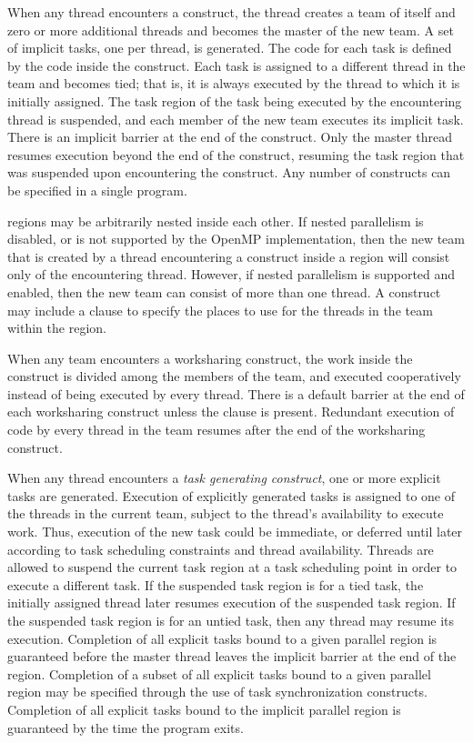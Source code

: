 When any thread encounters a  construct, the thread creates a team of itself
and zero or more additional threads and becomes the master of the new team. A set of 
implicit tasks, one per thread, is generated. The code for each task is defined by the code 
inside the  construct. Each task is assigned to a different thread in the team
and becomes tied; that is, it is always executed by the thread to which it is initially 
assigned. The task region of the task being executed by the encountering thread is 
suspended, and each member of the new team executes its implicit task. There is an 
implicit barrier at the end of the  construct. Only the master thread resumes
execution beyond the end of the  construct, resuming the task region that
was suspended upon encountering the  construct. Any number of
 constructs can be specified in a single program.

 regions may be arbitrarily nested inside each other. If nested parallelism is
disabled, or is not supported by the OpenMP implementation, then the new team that is 
created by a thread encountering a  construct inside a  region
will consist only of the encountering thread. However, if nested parallelism is supported 
and enabled, then the new team can consist of more than one thread. A 
construct may include a  clause to specify the places to use for the threads
in the team within the  region.

When any team encounters a worksharing construct, the work inside the construct is 
divided among the members of the team, and executed cooperatively instead of being 
executed by every thread. There is a default barrier at the end of each worksharing 
construct unless the  clause is present. Redundant execution of code by every
thread in the team resumes after the end of the worksharing construct.

When any thread encounters a \emph{task generating construct}, one or more explicit tasks are generated.
Execution of explicitly generated tasks is assigned to one of the threads in the current 
team, subject to the thread's availability to execute work. Thus, execution of the new 
task could be immediate, or deferred until later according to task scheduling constraints 
and thread availability. Threads are allowed to suspend the current task region at a task 
scheduling point in order to execute a different task. If the suspended task region is for
a tied task, the initially assigned thread later resumes execution of the suspended task
region. If the suspended task region is for an untied task, then any thread may resume its
execution. Completion of all explicit tasks bound to a given parallel region is guaranteed
before the master thread leaves the implicit barrier at the end of the region. Completion
of a subset of all explicit tasks bound to a given parallel region may be specified through
the use of task synchronization constructs. Completion of all explicit tasks bound to the
implicit parallel region is guaranteed by the time the program exits.

